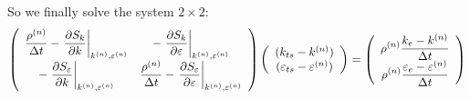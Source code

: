 So we finally solve the system $2\times 2$:
\begin{equation}
\left(\begin{array}{cc}
\displaystyle \frac{\rho^{(n)}}{\Delta t}
-\left.\frac{\partial S_k}{\partial k}\right|_{k^{(n)},\varepsilon^{(n)}}
&\displaystyle
-\left.\frac{\partial S_k}{\partial \varepsilon}\right|_{k^{(n)},\varepsilon^{(n)}}\\
\displaystyle
-\left.\frac{\partial S_\varepsilon}{\partial k}\right|_{k^{(n)},\varepsilon^{(n)}}
&\displaystyle
\displaystyle \frac{\rho^{(n)}}{\Delta t}
-\left.\frac{\partial S_\varepsilon}{\partial \varepsilon}\right|_{k^{(n)},\varepsilon^{(n)}}
\end{array}\right)
\left(\begin{array}{c}
(k_{ts}-k^{(n)})\\(\varepsilon_{ts}-\varepsilon^{(n)})
\end{array}\right)
=\left(\begin{array}{c}
\displaystyle\rho^{(n)}\frac{k_e-k^{(n)}}{\Delta t}\\
\displaystyle\rho^{(n)}\frac{\varepsilon_e-\varepsilon^{(n)}}{\Delta t}
\end{array}\right)
\end{equation}

\vspace*{0.2cm}


